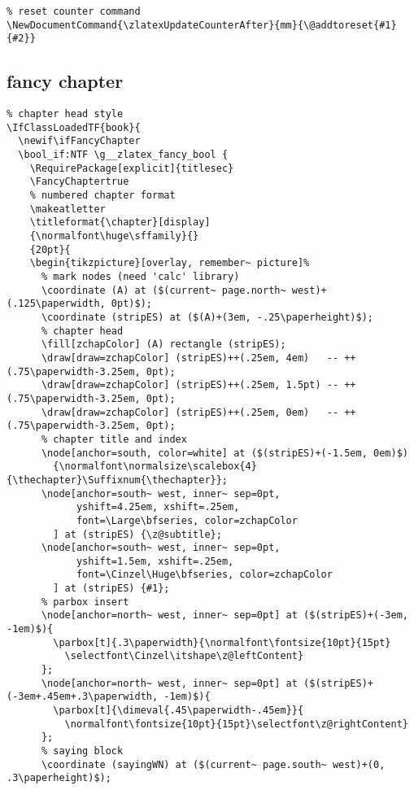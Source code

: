 \begin{verbatim}
% reset counter command
\NewDocumentCommand{\zlatexUpdateCounterAfter}{mm}{\@addtoreset{#1}{#2}}
\end{verbatim}


\subsection{fancy chapter}
\begin{verbatim}
% chapter head style
\IfClassLoadedTF{book}{
  \newif\ifFancyChapter
  \bool_if:NTF \g__zlatex_fancy_bool {
    \RequirePackage[explicit]{titlesec}
    \FancyChaptertrue
    % numbered chapter format
    \makeatletter
    \titleformat{\chapter}[display]
    {\normalfont\huge\sffamily}{}
    {20pt}{
    \begin{tikzpicture}[overlay, remember~ picture]%
      % mark nodes (need 'calc' library)
      \coordinate (A) at ($(current~ page.north~ west)+(.125\paperwidth, 0pt)$);
      \coordinate (stripES) at ($(A)+(3em, -.25\paperheight)$);
      % chapter head
      \fill[zchapColor] (A) rectangle (stripES);
      \draw[draw=zchapColor] (stripES)++(.25em, 4em)   -- ++(.75\paperwidth-3.25em, 0pt);
      \draw[draw=zchapColor] (stripES)++(.25em, 1.5pt) -- ++(.75\paperwidth-3.25em, 0pt);
      \draw[draw=zchapColor] (stripES)++(.25em, 0em)   -- ++(.75\paperwidth-3.25em, 0pt);
      % chapter title and index
      \node[anchor=south, color=white] at ($(stripES)+(-1.5em, 0em)$)
        {\normalfont\normalsize\scalebox{4}{\thechapter}\Suffixnum{\thechapter}};
      \node[anchor=south~ west, inner~ sep=0pt, 
            yshift=4.25em, xshift=.25em, 
            font=\Large\bfseries, color=zchapColor
        ] at (stripES) {\z@subtitle};
      \node[anchor=south~ west, inner~ sep=0pt,
            yshift=1.5em, xshift=.25em,
            font=\Cinzel\Huge\bfseries, color=zchapColor
        ] at (stripES) {#1};
      % parbox insert
      \node[anchor=north~ west, inner~ sep=0pt] at ($(stripES)+(-3em, -1em)$){
        \parbox[t]{.3\paperwidth}{\normalfont\fontsize{10pt}{15pt}
          \selectfont\Cinzel\itshape\z@leftContent}
      };
      \node[anchor=north~ west, inner~ sep=0pt] at ($(stripES)+(-3em+.45em+.3\paperwidth, -1em)$){
        \parbox[t]{\dimeval{.45\paperwidth-.45em}}{
          \normalfont\fontsize{10pt}{15pt}\selectfont\z@rightContent}
      };
      % saying block
      \coordinate (sayingWN) at ($(current~ page.south~ west)+(0, .3\paperheight)$); 

\end{verbatim}
